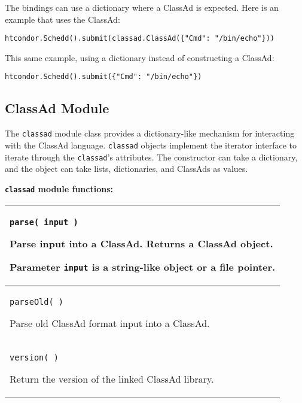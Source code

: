 The bindings can use a dictionary where a ClassAd is expected.
Here is an example that uses the ClassAd:
\footnotesize
\begin{verbatim}
htcondor.Schedd().submit(classad.ClassAd({"Cmd": "/bin/echo"}))
\end{verbatim}
\normalsize
This same example, using a dictionary instead of constructing a ClassAd:
\footnotesize
\begin{verbatim}
htcondor.Schedd().submit({"Cmd": "/bin/echo"})
\end{verbatim}
\normalsize


\subsection{\label{Python-ClassAd} ClassAd Module}

The \texttt{classad} module class provides a dictionary-like mechanism 
for interacting with the ClassAd language. 
\texttt{classad} objects implement the iterator interface to iterate 
through the \texttt{classad}'s attributes.
The constructor can take a dictionary,
and the object can take lists, dictionaries, and ClassAds as values.

\textbf{\texttt{classad} module functions:}
\begin{flushleft}
\begin{tabular}{|p{14cm}|} \hline
\texttt{parse( input )}

Parse input into a ClassAd.  
Returns a ClassAd object.

Parameter \texttt{input} is a string-like object or a file pointer.
\\ \hline

\texttt{parseOld( )}

Parse old ClassAd format input into a ClassAd.
\\ \hline
\texttt{version( )}

Return the version of the linked ClassAd library.
\\ \hline

\end{tabular}
\end{flushleft}



